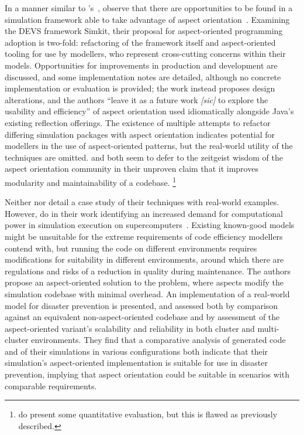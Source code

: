 In a manner similar to
\citeauthor{chibani2019using}'s~\cite{chibani2019using,chibani2013toward,chibani2014practical},
\citeauthor{DEVSaspectorientation2008aksu} observe that there are opportunities
to be found in a simulation framework able to take advantage of aspect
orientation~\cite{DEVSaspectorientation2008aksu}. Examining the DEVS framework
Simkit, their proposal for aspect-oriented programming adoption is two-fold:
refactoring of the framework itself and aspect-oriented tooling for use by
modellers, who represent cross-cutting concerns within their models.
Opportunities for improvements in production and development are discussed, and
some implementation notes are detailed, although no concrete implementation or
evaluation is provided; the work instead proposes design alterations, and the
authors ``leave it as a future work \emph{[sic]} to explore the usability and
efficiency'' of aspect orientation used idiomatically alongside Java's existing
reflection offerings. The existence of multiple attempts to refactor differing
simulation packages with aspect orientation indicates potential for modellers in
the use of aspect-oriented patterns, but the real-world utility of the
techniques are omitted. \citeauthor{chibani2019using} and
\citeauthor{DEVSaspectorientation2008aksu} both seem to defer to the zeitgeist
wisdom of the aspect orientation community in their unproven claim that it
improves modularity and maintainability of a codebase.
\footnote{\citeauthor{chibani2014practical} do present some quantitative
evaluation, but this is flawed as previously described.}

Neither \citeauthor{gulyas1999use} nor
\citeauthor{DEVSaspectorientation2008aksu} detail a case study of their
techniques with real-world examples. However, \citeauthor{ionescu2009aspect} do
in their work identifying an increased demand for computational power in
simulation execution on supercomputers~\cite{ionescu2009aspect}. Existing
known-good models might be unsuitable for the extreme requirements of code
efficiency modellers contend with, but running the code on different
environments requires modifications for suitability in different environments,
around which there are regulations and risks of a reduction in quality during
maintenance. The authors propose an aspect-oriented solution to the problem,
where aspects modify the simulation codebase with minimal overhead. An
implementation of a real-world model for disaster prevention is presented, and
assessed both by comparison against an equivalent non-aspect-oriented codebase
and by assessment of the aspect-oriented variant's scalability and reliability
in both cluster and multi-cluster environments. They find that a comparative
analysis of generated code and of their simulations in various configurations
both indicate that their simulation's aspect-oriented implementation is suitable
for use in disaster prevention, implying that aspect orientation could be
suitable in scenarios with comparable requirements.

